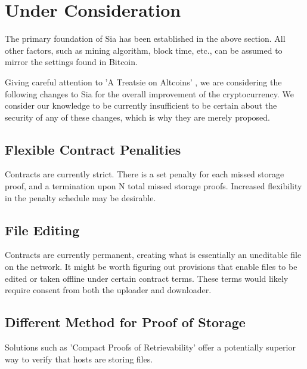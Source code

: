 \documentclass[twocolumn]{article}
\begin{document}

\section{Under Consideration}
The primary foundation of Sia has been established in the above section.
All other factors, such as mining algorithm, block time, etc., can be assumed to mirror the settings found in Bitcoin.

Giving careful attention to 'A Treatsie on Altcoins' \cite{alts}, we are considering the following changes to Sia for the overall improvement of the cryptocurrency.
We consider our knowledge to be currently insufficient to be certain about the security of any of these changes, which is why they are merely proposed.

\subsection{Flexible Contract Penalities}
Contracts are currently strict.
There is a set penalty for each missed storage proof, and a termination upon N total missed storage proofs.
Increased flexibility in the penalty schedule may be desirable.

\subsection{File Editing}
Contracts are currently permanent, creating what is essentially an uneditable file on the network.
It might be worth figuring out provisions that enable files to be edited or taken offline under certain contract terms.
These terms would likely require consent from both the uploader and downloader.

\subsection{Different Method for Proof of Storage}
Solutions such as 'Compact Proofs of Retrievability' \cite{cpr} offer a potentially superior way to verify that hosts are storing files.
\end{document}
